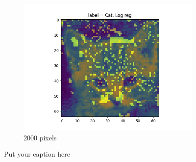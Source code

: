 \documentclass{article}
\begin{document}
\begin{figure}[H]
\begin{subfigure}{.33\textwidth}
  \includegraphics[width=1\linewidth]{2e/,2000, Log reg.png}  
  \caption{2000 pixels}
  \label{fig:sub-second}
\end{subfigure}
\caption{Put your caption here}
\label{feet select 2d}
\end{figure}
\end{document}
